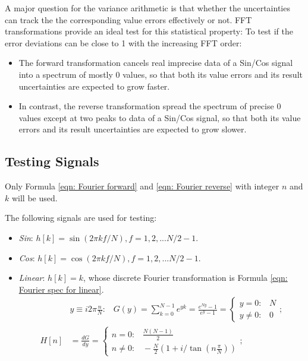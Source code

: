 \documentclass[twoside]{article}
\numberwithin{equation}{section}
\newcommand{\eqspace}{\;\;\;}
\begin{document}
A major question for the variance arithmetic is that whether the uncertainties can track the the corresponding value errors effectively or not.
FFT transformations provide an ideal test for this statistical property: To test if the error deviations can be close to 1 with the increasing FFT order:
\begin{itemize}
\item The forward transformation cancels real imprecise data of a Sin/Cos signal into a spectrum of mostly $0$ values, so that both its value errors and its result uncertainties are expected to grow faster. 

\item In contrast, the reverse transformation spread the spectrum of precise $0$ values except at two peaks to data of a Sin/Cos signal, so that both its value errors and its result uncertainties are expected to grow slower. 
\end{itemize}




\subsection{Testing Signals}

Only Formula \eqref{eqn: Fourier forward} and \eqref{eqn: Fourier reverse} with integer $n$ and $k$ will be used.

The following signals are used for testing:
\begin{itemize}
\item \emph{Sin}: $h[k] = \sin(2\pi k f/N), f = 1, 2, ... N/2 -1$.

\item \emph{Cos}: $h[k] = \cos(2\pi k f/N), f = 1, 2, ... N/2 -1$.

\item \emph{Linear}: $h[k] = k$, whose discrete Fourier transformation is Formula \eqref{eqn: Fourier spec for linear}.
\begin{align}
& y \equiv i 2\pi \frac{n}{N}: \eqspace G(y) = \sum_{k=0}^{N-1}  e^{y k} = \frac{e^{N y} - 1}{e^y - 1}
 = \begin{cases} y = 0: \eqspace N \\ y \neq 0: \eqspace 0 \end{cases}; \nonumber \\
\label{eqn: Fourier spec for linear}
H[n] &= \frac{d G}{d y} = \begin{cases} n = 0: \eqspace \frac{N (N-1)}{2} \\ n \neq 0: \eqspace - \frac{N}{2}(1 + i /\tan(n \frac{\pi}{N})) \end{cases};
\end{align}

\end{itemize}
\end{document}
